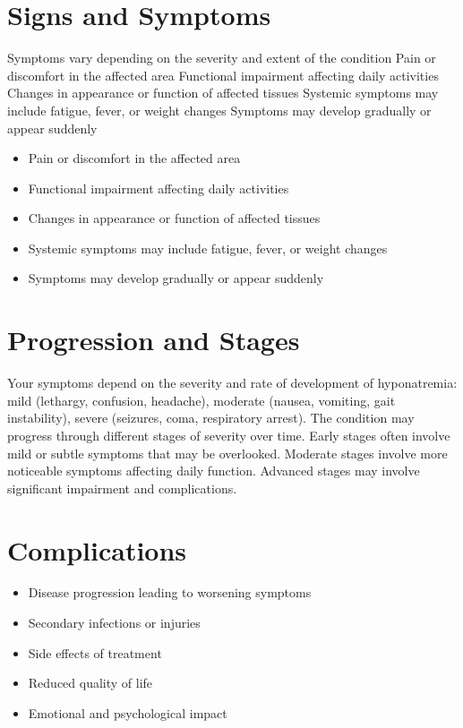 \section{Signs and Symptoms}
Symptoms vary depending on the severity and extent of the condition Pain or discomfort in the affected area Functional impairment affecting daily activities Changes in appearance or function of affected tissues Systemic symptoms may include fatigue, fever, or weight changes Symptoms may develop gradually or appear suddenly

\begin{itemize}[noitemsep]
  \item Pain or discomfort in the affected area
  \item Functional impairment affecting daily activities
  \item Changes in appearance or function of affected tissues
  \item Systemic symptoms may include fatigue, fever, or weight changes
  \item Symptoms may develop gradually or appear suddenly
\end{itemize}
\section{Progression and Stages}
Your symptoms depend on the severity and rate of development of hyponatremia: mild (lethargy, confusion, headache), moderate (nausea, vomiting, gait instability), severe (seizures, coma, respiratory arrest). The condition may progress through different stages of severity over time. Early stages often involve mild or subtle symptoms that may be overlooked. Moderate stages involve more noticeable symptoms affecting daily function. Advanced stages may involve significant impairment and complications.
\section{Complications}
\begin{itemize}[noitemsep]
  \item Disease progression leading to worsening symptoms
  \item Secondary infections or injuries
  \item Side effects of treatment
  \item Reduced quality of life
  \item Emotional and psychological impact
\end{itemize}
